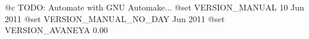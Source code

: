 @c TODO: Automate with GNU Automake...
@set VERSION_MANUAL         10 Jun 2011
@set VERSION_MANUAL_NO_DAY  Jun 2011
@set VERSION_AVANEYA        0.00

